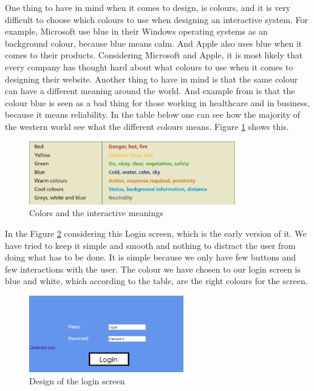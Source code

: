 One thing to have in mind when it comes to design, is colours, and it is very difficult to choose which colours to use when designing an interactive system. For example, Microsoft use blue in their Windows operating systems as an background colour, because blue means calm. And Apple also uses blue when it comes to their products. Considering Microsoft and Apple, it is most likely that every company has thought hard about what colours to use when it comes to designing their website. 
Another thing to have in mind is that the same colour can have a different meaning around the world. And example from \cite{DEBBook} is that the colour blue is seen as a bad thing for those working in healthcare and in business, because it means reliability.
In the table below one can see how the majority of the western world see what the different colours means. Figure \ref{Colors} shows this.

\begin{figure}[htb]
\centering
\includegraphics[width=0.8\textwidth]{Images/Colors.png}
\caption{Colors and the interactive meanings}
\label{Colors}
\end{figure}

In the Figure \ref{Login} considering this Login screen, which is the early version of it. We have tried to keep it simple and smooth and nothing to distract the user from doing what has to be done. It is simple because we only have few buttons and few interactions with the user. The colour we have chosen to our login screen is blue and white, which according to the table, are the right colours for the screen.

\begin{figure}[htb]
\centering
\includegraphics[width=0.6\textwidth]{Images/Login.png}
\caption{Design of the login screen}
\label{Login}
\end{figure}

